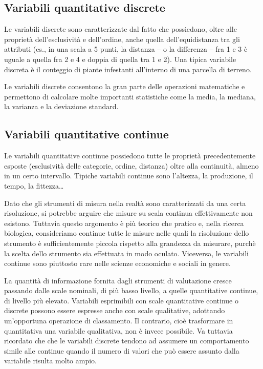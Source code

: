 \documentclass[a4paper,12pt,oneside]{book}
\begin{document}
\hypertarget{variabili-quantitative-discrete}{%
\subsection{Variabili quantitative discrete}\label{variabili-quantitative-discrete}}

Le variabili discrete sono caratterizzate dal fatto che possiedono, oltre alle proprietà dell'esclusività e dell'ordine, anche quella dell'equidistanza tra gli attributi (es., in una scala a 5 punti, la distanza -- o la differenza -- fra 1 e 3 è uguale a quella fra 2 e 4 e doppia di quella tra 1 e 2). Una tipica variabile discreta è il conteggio di piante infestanti all'interno di una parcella di terreno.

Le variabili discrete consentono la gran parte delle operazioni matematiche e permettono di calcolare molte importanti statistiche come la media, la mediana, la varianza e la deviazione standard.

\hypertarget{variabili-quantitative-continue}{%
\subsection{Variabili quantitative continue}\label{variabili-quantitative-continue}}

Le variabili quantitative continue possiedono tutte le proprietà precedentemente esposte (esclusività delle categorie, ordine, distanza) oltre alla continuità, almeno in un certo intervallo. Tipiche variabili continue sono l'altezza, la produzione, il tempo, la fittezza\ldots{}

Dato che gli strumenti di misura nella realtà sono caratterizzati da una certa risoluzione, si potrebbe arguire che misure su scala continua effettivamente non esistono. Tuttavia questo argomento è più teorico che pratico e, nella ricerca biologica, consideriamo continue tutte le misure nelle quali la risoluzione dello strumento è sufficientemente piccola rispetto alla grandezza da misurare, purchè la scelta dello strumento sia effettuata in modo oculato. Viceversa, le variabili continue sono piuttosto rare nelle scienze economiche e sociali in genere.

La quantità di informazione fornita dagli strumenti di valutazione cresce passando dalle scale nominali, di più basso livello, a quelle quantitative continue, di livello più elevato. Variabili esprimibili con scale quantitative continue o discrete possono essere espresse anche con scale qualitative, adottando un'opportuna operazione di classamento. Il contrario, cioè trasformare in quantitativa una variabile qualitativa, non è invece possibile.
Va tuttavia ricordato che che le variabili discrete tendono ad assumere un comportamento simile alle continue quando il numero di valori che può essere assunto dalla variabile risulta molto ampio.
\end{document}
